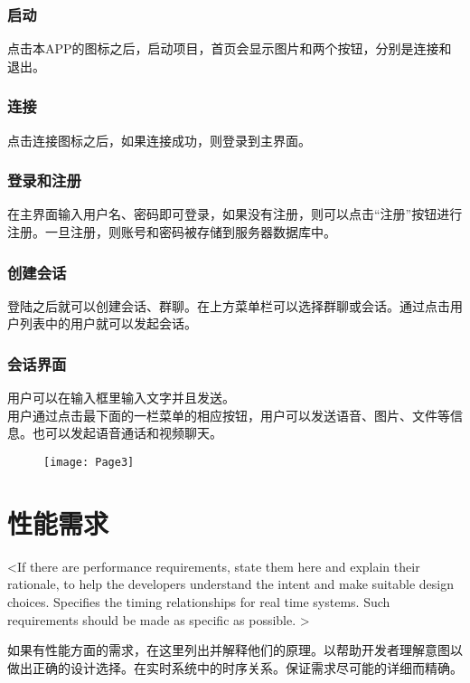 \subsubsection{启动}
  点击本APP的图标之后，启动项目，首页会显示图片和两个按钮，分别是连接和退出。
\subsubsection{连接}
  点击连接图标之后，如果连接成功，则登录到主界面。
\subsubsection{登录和注册}
  在主界面输入用户名、密码即可登录，如果没有注册，则可以点击“注册”按钮进行注册。一旦注册，则账号和密码被存储到服务器数据库中。
\subsubsection{创建会话}
  登陆之后就可以创建会话、群聊。在上方菜单栏可以选择群聊或会话。通过点击用户列表中的用户就可以发起会话。
\subsubsection{会话界面}
  用户可以在输入框里输入文字并且发送。\\
  用户通过点击最下面的一栏菜单的相应按钮，用户可以发送语音、图片、文件等信息。也可以发起语音通话和视频聊天。
  \begin{figure}[!h]
  	\centering
	\texttt{[image: Page3]}
	\label{fig:noted-figure}
  \end{figure}  

\section{性能需求}
\iffalse
<If there are performance requirements, state them here and explain their rationale, to help the developers understand the intent and make suitable design choices. Specifies the timing relationships for real time systems. Such requirements should be made as specific as possible. >

如果有性能方面的需求，在这里列出并解释他们的原理。以帮助开发者理解意图以做出正确的设计选择。在实时系统中的时序关系。保证需求尽可能的详细而精确。

